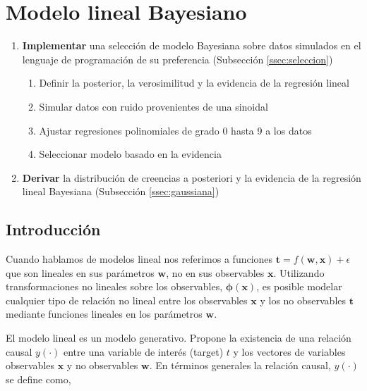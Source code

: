 \section{Modelo lineal Bayesiano} \label{sec:lineal}

\begin{framed}
\begin{enumerate}
 \item \textbf{Implementar} una selección de modelo Bayesiana sobre datos simulados en el lenguaje de programaci\'on de su preferencia (Subsecci\'on \ref{ssec:seleccion})
 \begin{enumerate}[i]
  \item Definir la posterior, la verosimilitud y la evidencia de la regresi\'on lineal
  \item Simular datos con ruido provenientes de una sinoidal
  \item Ajustar regresiones polinomiales de grado 0 hasta 9 a los datos
  \item Seleccionar modelo basado en la evidencia
 \end{enumerate}
 \item \textbf{Derivar} la distribuci\'on de creencias a posteriori y la evidencia de la regresi\'on lineal Bayesiana (Subsecci\'on \ref{ssec:gaussiana})
 \end{enumerate}
\end{framed}

 
\subsection{Introducci\'on}

Cuando hablamos de modelos lineal nos referimos a funciones $\bm{t}= f(\bm{w},\bm{x}) + \epsilon $ que son lineales en sus parámetros $\bm{w}$, no en sus observables $\bm{x}$.
Utilizando transformaciones no lineales sobre los observables, $\bm{\phi}(\bm{x})$, es posible modelar cualquier tipo de relaci\'on no lineal entre los observables $\bm{x}$ y los no observables $\bm{t}$ mediante funciones lineales en los par\'ametros $\bm{w}$.

\vspace{0.3cm}

El modelo lineal es un modelo generativo. Propone la existencia de una relaci\'on causal $y(\cdot)$ entre una variable de inter\'es (target) $t$ y los vectores de variables observables $\bm{x}$ y no observables $\bm{w}$.
En t\'erminos generales la relaci\'on causal, $y(\cdot)$ se define como,

